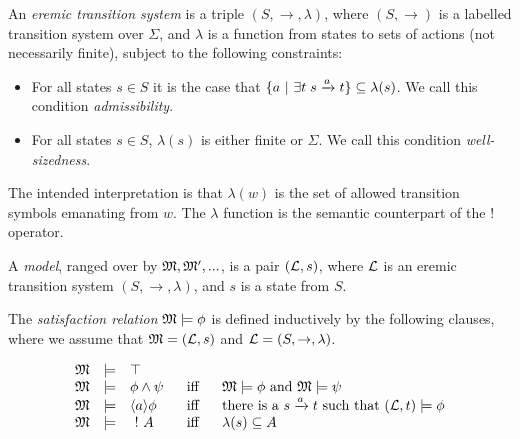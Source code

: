 \begin{definition}
An \emph{eremic transition system} is a triple $(S, \rightarrow,
\lambda)$, where $(S, \rightarrow)$ is a labelled transition system
over $\Sigma$, and $\lambda$ is a function from states to sets of
actions (not necessarily finite), subject to the following constraints:
\begin{itemize}

\item For all states $s \in S$ it is the case that $ \{a \ | \  \exists
  t \; s \xrightarrow{a} t\} \subseteq \lambda(s)$. We call this
  condition \emph{admissibility}.

\item For all states $s \in S$, $\lambda (s)$ is either finite or
  $\Sigma$. We call this condition \emph{well-sizedness}.

\end{itemize}

\end{definition}

\NI The intended interpretation is that $\lambda(w)$ is the set of
allowed transition symbols emanating from $w$.  The $\lambda$ function
is the semantic counterpart of the $!$ operator. 


\begin{definition}
A \emph{model}, ranged over by $\frak{M}, \frak{M}', ...$, is a pair $(\mathcal{L},
s)$, where $\mathcal{L}$ is an eremic transition system $(S, \rightarrow,
\lambda)$, and $s$ is a state from $S$.
\end{definition}



\begin{definition}
The \emph{satisfaction relation} $\frak{M} \models \phi$ is defined
inductively by the following clauses, where we assume that $\frak{M} =
(\mathcal{L}, s)$ and $\mathcal{L} = (S, \rightarrow, \lambda)$.

\[
\begin{array}{lclcl}
  \frak{M} & \models & \top   \\
  \frak{M} & \models & \phi \land \psi &\ \mbox{ iff } \ & \frak{M}  \models \phi \mbox { and } \frak{M} \models \psi  \\
  \frak{M} & \models & \langle a \rangle \phi & \mbox{ iff } & \text{there is a } s \xrightarrow{a} t \mbox { such that } (\mathcal{L}, t) \models \phi  \\
  \frak{M} & \models & \ ! \  A &\mbox{ iff } & \lambda(s) \subseteq A
\end{array}
\]

\end{definition}

